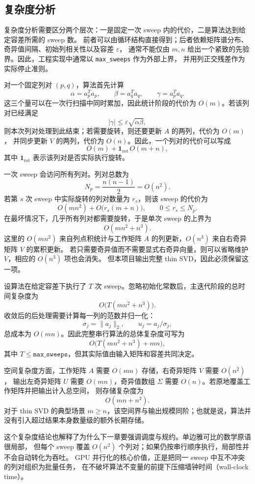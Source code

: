 \subsection{复杂度分析}

复杂度分析需要区分两个层次：一是固定一次 sweep 内的代价，二是算法达到给定容差所需的 sweep 数。
前者可以由循环结构直接得到；后者依赖矩阵谱分布、奇异值间隔、初始列相关性以及容差 $\varepsilon$，
通常不能仅由 $m,n$ 给出一个紧致的先验界。因此，工程实现中通常以 \texttt{max\_sweeps} 作为外部上界，
并用列正交残差作为实际停止准则。

对一个固定列对 $(p,q)$，算法首先计算
\[
    \alpha=a_p^Ta_p,\qquad
    \beta=a_q^Ta_q,\qquad
    \gamma=a_p^Ta_q.
\]
这三个量可以在一次行扫描中同时累加，因此统计阶段的代价为 $O(m)$。若该列对已经满足
\[
    |\gamma|\le \varepsilon\sqrt{\alpha\beta},
\]
则本次列对处理到此结束；若需要旋转，则还要更新 $A$ 的两列，代价为 $O(m)$，
并同步更新 $V$ 的两列，代价为 $O(n)$。因此，一个列对的代价可以写成
\[
    O(m) + \mathbf{1}_{\mathrm{rot}}\,O(m+n),
\]
其中 $\mathbf{1}_{\mathrm{rot}}$ 表示该列对是否实际执行旋转。

一次 sweep 会访问所有列对。列对总数为
\[
    N_p=\frac{n(n-1)}{2}=O(n^2).
\]
若第 $s$ 次 sweep 中实际旋转的列对数量为 $r_s$，则该 sweep 的代价为
\[
    O(mn^2)+O\bigl(r_s(m+n)\bigr),
    \qquad 0\le r_s\le N_p.
\]
在最坏情况下，几乎所有列对都需要旋转，于是单次 sweep 的上界为
\[
    O(mn^2+n^3).
\]
这里的 $O(mn^2)$ 来自列点积统计与工作矩阵 $A$ 的列更新，$O(n^3)$ 来自右奇异矩阵 $V$ 的累积更新。
若只需要奇异值而不需要显式右奇异向量，则可以省略维护 $V$，相应的 $O(n^3)$ 项也会消失。
但本项目输出完整 thin SVD，因此必须保留这一项。

设算法在给定容差下执行了 $T$ 次 sweep。忽略初始化常数后，主迭代阶段的总时间复杂度为
\[
    O\bigl(T(mn^2+n^3)\bigr).
\]
收敛后的后处理需要计算每一列的范数并归一化：
\[
    \sigma_j=\|a_j\|_2,\qquad u_j=a_j/\sigma_j,
\]
总成本为 $O(mn)$。因此完整串行算法的总体复杂度可写为
\[
    O\bigl(T(mn^2+n^3)+mn\bigr),
\]
其中 $T\le \texttt{max\_sweeps}$，但其实际值由输入矩阵和容差共同决定。

空间复杂度方面，工作矩阵 $A$ 需要 $O(mn)$ 存储，右奇异矩阵 $V$ 需要 $O(n^2)$，
输出左奇异矩阵 $U$ 需要 $O(mn)$，奇异值数组 $\Sigma$ 需要 $O(n)$。若原地覆盖工作矩阵并把输出计入总空间，
则存储复杂度为
\[
    O(mn+n^2).
\]
对于 thin SVD 的典型场景 $m\ge n$，该空间界与输出规模同阶；也就是说，算法并没有引入超过结果本身数量级的额外长期存储。

这个复杂度结论也解释了为什么下一章要强调调度与规约。单边雅可比的数学原语很局部，
但每个 sweep 覆盖 $O(n^2)$ 个列对；如果仍按串行顺序执行，局部性并不会自动转化为吞吐。
GPU 并行化的核心价值，正是把同一 sweep 中互不冲突的列对组织为批量任务，
在不破坏算法不变量的前提下压缩墙钟时间（wall-clock time）。
